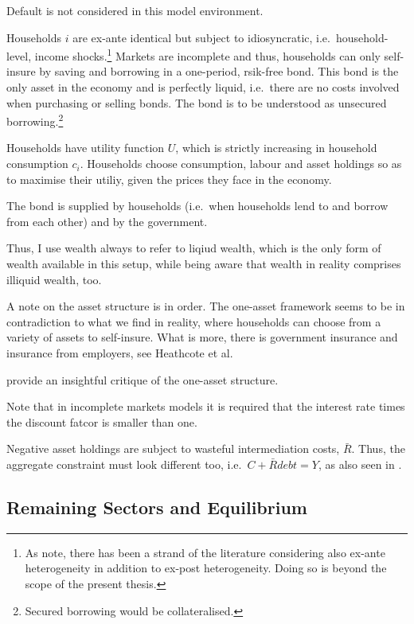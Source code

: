 \documentclass[12pt]{article} %
\numberwithin{equation}{section} %
\begin{document}
Default is not considered in this model environment.

Households $i$ are ex-ante identical but subject to idiosyncratic, i.e.~household-level, income shocks.\footnote{As \textcite{cherrier2023} note, there has been a strand of the literature considering also ex-ante heterogeneity in addition to ex-post heterogeneity. Doing so is beyond the scope of the present thesis.} Markets are incomplete and thus, households can only self-insure by saving and borrowing in a one-period, rsik-free bond. This bond is the only asset in the economy and is perfectly liquid, i.e.~there are no costs involved when purchasing or selling bonds. The bond is to be understood as unsecured borrowing.\footnote{Secured borrowing would be collateralised.}

Households have utility function $U$, which is strictly increasing in household consumption $c_i$. Households choose consumption, labour and asset holdings so as to maximise their utiliy, given the prices they face in the economy.

The bond is supplied by households (i.e.~when households lend to and borrow from each other) and by the government. %

Thus, I use wealth always to refer to liqiud wealth, which is the only form of wealth available in this setup, while being aware that wealth in reality comprises illiquid wealth, too.

A note on the asset structure is in order. The one-asset framework seems to be in contradiction to what we find in reality, where households can choose from a variety of assets to self-insure. What is more, there is government insurance and insurance from employers, see Heathcote et al.

\textcite{kaplan2018} provide an insightful critique of the one-asset structure. 

Note that in incomplete markets models it is required that the interest rate times the discount fatcor is smaller than one.

Negative asset holdings are subject to wasteful intermediation costs, $\bar{R}$. Thus, the aggregate constraint must look different too, i.e.~$C + \bar{R} debt = Y$, as also seen in \textcite{kaplan2018}.

\subsection{Remaining Sectors and Equilibrium}
\label{sec:model-sectors}
\end{document}
